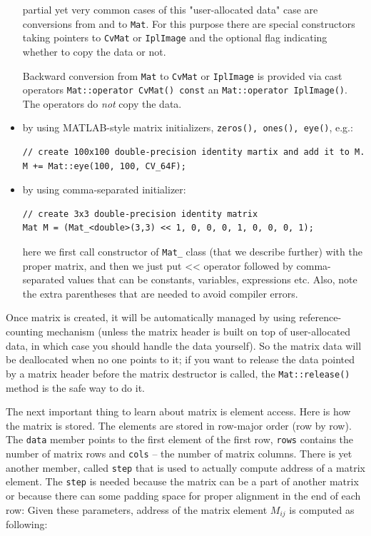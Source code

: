 \begin{itemize}
        partial yet very common cases of this "user-allocated data" case are conversions
        from  and  to \texttt{Mat}. For this purpose there are special constructors
        taking pointers to \texttt{CvMat} or \texttt{IplImage} and the optional
        flag indicating whether to copy the data or not.
        
        Backward conversion from \texttt{Mat} to \texttt{CvMat} or \texttt{IplImage} is provided via cast operators
        \texttt{Mat::operator CvMat() const} an \texttt{Mat::operator IplImage()}.
        The operators do \emph{not} copy the data.
        
\item by using MATLAB-style matrix initializers, \texttt{zeros(), ones(), eye()}, e.g.:

\begin{lstlisting}
// create 100x100 double-precision identity martix and add it to M.
M += Mat::eye(100, 100, CV_64F);
\end{lstlisting}

\item by using comma-separated initializer:
\begin{lstlisting}
// create 3x3 double-precision identity matrix
Mat M = (Mat_<double>(3,3) << 1, 0, 0, 0, 1, 0, 0, 0, 1);
\end{lstlisting}

here we first call constructor of \texttt{Mat\_} class (that we describe further) with the proper matrix, and then we just put << operator followed by comma-separated values that can be constants, variables, expressions etc. Also, note the extra parentheses that are needed to avoid compiler errors.
        
\end{itemize}

Once matrix is created, it will be automatically managed by using reference-counting mechanism (unless the matrix header is built on top of user-allocated data, in which case you should handle the data yourself).
So the matrix data will be deallocated when no one points to it; if you want to release the data pointed by a matrix header before the matrix destructor is called, the \texttt{Mat::release()} method is the safe way to do it.

The next important thing to learn about matrix is element access. Here is how the matrix is stored. The elements are stored in row-major order (row by row). The \texttt{data} member points to the first element of the first row, \texttt{rows} contains the number of matrix rows and \texttt{cols} -- the number of matrix columns. There is yet another member, called \texttt{step} that is used to actually compute address of a matrix element. The \texttt{step} is needed because the matrix can be a part of another matrix or because there can some padding space for proper alignment in the end of each row:
Given these parameters, address of the matrix element $M_{ij}$ is computed as following:


